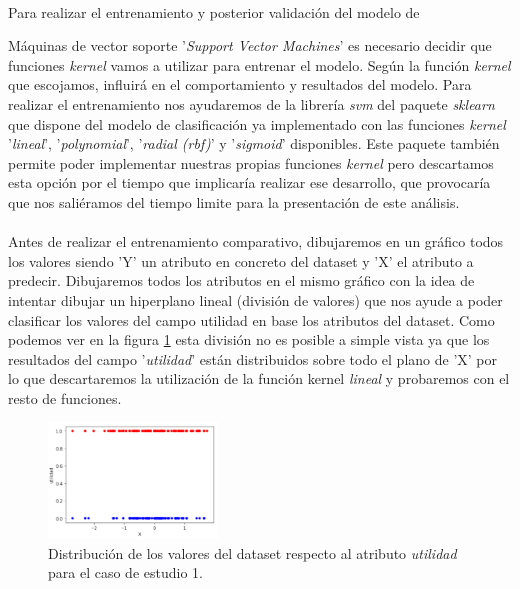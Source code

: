\paragraph{}
Para realizar el entrenamiento y posterior validación del modelo de {Máquinas de vector soporte '\textit{Support Vector Machines}' es necesario decidir que funciones \textit{kernel} vamos a utilizar para entrenar el modelo. Según la función \textit{kernel} que escojamos, influirá en el comportamiento y resultados del modelo. Para realizar el entrenamiento nos ayudaremos de la librería \textit{svm} del paquete \textit{sklearn} que dispone del modelo de clasificación\cite{ref:svm_sklearn_svc} ya implementado con las funciones \textit{kernel} '\textit{lineal}', '\textit{polynomial}', '\textit{radial (rbf)}' y '\textit{sigmoid}'\cite{ref:svm_kernels_sklearn} disponibles. Este paquete también permite poder implementar nuestras propias funciones \textit{kernel} pero descartamos esta opción por el tiempo que implicaría realizar ese desarrollo, que provocaría que nos saliéramos del tiempo limite para la presentación de este análisis.

\paragraph{}
Antes de realizar el entrenamiento comparativo, dibujaremos en un gráfico todos los valores siendo 'Y' un atributo en concreto del dataset y 'X' el atributo a predecir. Dibujaremos todos los atributos en el mismo gráfico con la idea de intentar dibujar un hiperplano lineal (división de valores) que nos ayude a poder clasificar los valores del campo utilidad en base los atributos del dataset. Como podemos ver en la figura \ref{svmDistribution} esta división no es posible a simple vista ya que los resultados del campo '\textit{utilidad}' están distribuidos sobre todo el plano de 'X' por lo que descartaremos la utilización de la función kernel \textit{lineal} y probaremos con el resto de funciones.

\begin{figure}[!htb]
  \centering
    \includegraphics[width=0.4\textwidth]{images/resultados_svm_distribucion.png}
    \caption{Distribución de los valores del dataset respecto al atributo \textit{utilidad} para el caso de estudio 1.}
  \label{svmDistribution}
\end{figure}

}
